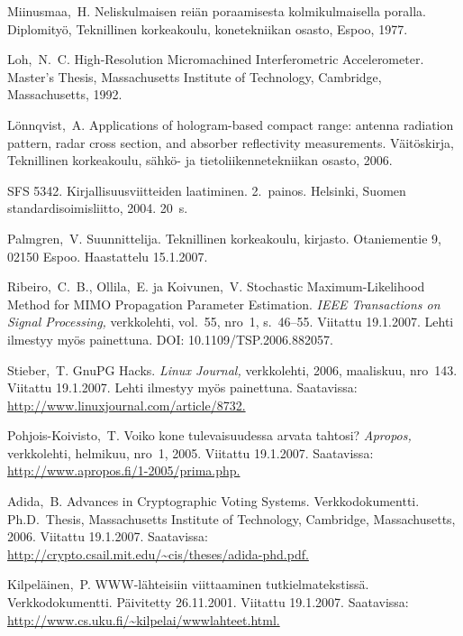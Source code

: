 \documentclass[english, 12pt, a4paper, elec, utf8, a-1b, online]{aaltothesis}
\begin{document}
\begin{thebibliography}{99}
 Miinusmaa,\ H. Neliskulmaisen rei\"an poraamisesta
  kolmikulmaisella poralla. Diplomity\"o, Teknillinen korkeakoulu,
  konetekniikan osasto, Espoo, 1977.

 Loh,\ N.\ C. High-Resolution Micromachined
  Interferometric Accelerometer. Master's Thesis, Massachusetts
  Institute of Technology, Cambridge,
  \foreignlanguage{english}{Massachusetts,} 1992.

 L\"onnqvist,\ A.
  \foreignlanguage{english}{Applications of hologram-based compact
    range: antenna radiation pattern, radar cross section, and
    absorber reflectivity measurements.}
  V\"ait\"oskirja, Teknillinen korkeakoulu, s\"ahk\"o- ja tietoliikennetekniikan
  osasto, 2006.

 SFS 5342. Kirjallisuusviitteiden laatiminen. 2.\ painos.
  Helsinki, Suomen standardisoimisliitto, 2004. 20~s.

 Palmgren,\ V. Suunnittelija. Teknillinen
  korkeakoulu, kirjasto. Otaniementie 9, 02150 Espoo. Haastattelu
  15.1.2007.

 Ribeiro,\ C.\ B., Ollila,\ E. ja Koivunen,\ V.
  \foreignlanguage{english}{Stochastic Maximum-Likelihood Method for
    MIMO Propagation Parameter Estimation.}
 \textit{IEEE Transactions
    on Signal Processing,} verkkolehti, vol.\ 55, nro~1, s.\ 46--55.
  Viitattu 19.1.2007. Lehti ilmestyy my\"os painettuna. DOI:
  10.1109/TSP.2006.882057.

 Stieber,\ T. GnuPG Hacks. \textit{Linux Journal,}
  verkkolehti, 2006, maaliskuu, nro~143. Viitattu 19.1.2007. Lehti
  ilmestyy my\"os painettuna. Saatavissa:
  \url{http://www.linuxjournal.com/article/8732.}

 Pohjois-Koivisto,\ T. Voiko kone tulevaisuudessa arvata
  tahtosi?  \textit{Apropos,} verkkolehti, helmikuu, nro~1, 2005.
  Viitattu 19.1.2007.  Saatavissa:
  \url{http://www.apropos.fi/1-2005/prima.php.}

 Adida,\ B.  Advances in Cryptographic Voting Systems.
  Verkkodokumentti. Ph.D.\ Thesis, Massachusetts Institute of
  Technology, Cambridge, 
  \foreignlanguage{english}{Massachusetts,}
  2006. Viitattu 19.1.2007.  Saatavissa:
  \url{http://crypto.csail.mit.edu/~cis/theses/adida-phd.pdf.}

 Kilpel\"ainen,\ P. WWW-l\"ahteisiin viittaaminen
  tutkielmatekstiss\"a. Verkkodokumentti. P\"aivitetty 26.11.2001.
  Viitattu 19.1.2007. Saatavissa:
  \url{http://www.cs.uku.fi/~kilpelai/wwwlahteet.html.}

\end{thebibliography}
\end{document}
